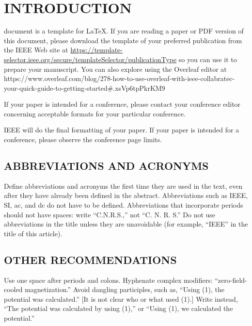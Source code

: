 \documentclass{ieeeojpel}
\begin{document}

\maketitle

\section{INTRODUCTION}
 document is a template for \LaTeX. If you are 
reading a paper or PDF version of this document, please download the 
template of your preferred publication from the IEEE Web site at \underline
{https://template-selector.ieee.org/secure/templateSelector}\break\underline{/publicationType} so you can use it to prepare your manuscript.
You can also explore using the Overleaf editor at 
{https://www.overleaf.com/blog/278-how-to-use-overleaf-with-ieee-collabratec-your-quick-guide-to-getting-started\break\#.xsVp6tpPkrKM9}

If your paper is intended for a conference, please contact your conference 
editor concerning acceptable formats for your particular 
conference.

IEEE will do the final formatting of your paper. If your paper is intended 
for a conference, please observe the conference page limits.

\subsection{ABBREVIATIONS AND ACRONYMS}
Define abbreviations and acronyms the first time they are used in the text, 
even after they have already been defined in the abstract. Abbreviations 
such as IEEE, SI, ac, and dc do not have to be defined. Abbreviations that 
incorporate periods should not have spaces: write ``C.N.R.S.,'' not ``C. N. 
R. S.'' Do not use abbreviations in the title unless they are unavoidable 
(for example, ``IEEE'' in the title of this article).

\subsection{OTHER RECOMMENDATIONS}
Use one space after periods and colons. Hyphenate complex modifiers: 
``zero-field-cooled magnetization.'' Avoid dangling participles, such as, 
``Using (1), the potential was calculated.'' [It is not clear who or what 
used (1).] Write instead, ``The potential was calculated by using (1),'' or 
``Using (1), we calculated the potential.''
\end{document}
